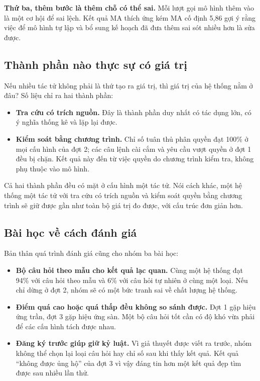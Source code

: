 \textbf{Thứ ba, thêm bước là thêm chỗ có thể sai.} Mỗi lượt gọi mô hình thêm vào là một cơ hội để sai lệch. Kết quả MA thích ứng kém MA cố định 5,86 \pp{} gợi ý rằng việc để mô hình tự lập và bổ sung kế hoạch đã đưa thêm sai sót nhiều hơn là sửa được.

\subsection{Thành phần nào thực sự có giá trị}

Nếu nhiều tác tử không phải là thứ tạo ra giá trị, thì giá trị của hệ thống nằm ở đâu? Số liệu chỉ ra hai thành phần:

\begin{itemize}
    \item \textbf{Tra cứu có trích nguồn.} Đây là thành phần duy nhất có tác dụng lớn, có ý nghĩa thống kê và lặp lại được.
    \item \textbf{Kiểm soát bằng chương trình.} Chỉ số tuân thủ phân quyền đạt 100\% ở mọi cấu hình của đợt 2; các câu lệnh cài cắm và yêu cầu vượt quyền ở đợt 1 đều bị chặn. Kết quả này đến từ việc quyền do chương trình kiểm tra, không phụ thuộc vào mô hình.
\end{itemize}

Cả hai thành phần đều có mặt ở cấu hình một tác tử. Nói cách khác, một hệ thống một tác tử với tra cứu có trích nguồn và kiểm soát quyền bằng chương trình sẽ giữ được gần như toàn bộ giá trị đo được, với cấu trúc đơn giản hơn.

\subsection{Bài học về cách đánh giá}

Bản thân quá trình đánh giá cũng cho nhóm ba bài học:

\begin{itemize}
    \item \textbf{Bộ câu hỏi theo mẫu cho kết quả lạc quan.} Cùng một hệ thống đạt 94\% với câu hỏi theo mẫu và 6\% với câu hỏi tự nhiên ở cùng một loại. Nếu chỉ dừng ở đợt 2, nhóm sẽ có một bức tranh sai về chất lượng hệ thống.
    \item \textbf{Điểm quá cao hoặc quá thấp đều không so sánh được.} Đợt 1 gặp hiệu ứng trần, đợt 3 gặp hiệu ứng sàn. Một bộ câu hỏi tốt cần có độ khó vừa phải để các cấu hình tách được nhau.
    \item \textbf{Đăng ký trước giúp giữ kỷ luật.} Vì giả thuyết được viết ra trước, nhóm không thể chọn lại loại câu hỏi hay chỉ số sau khi thấy kết quả. Kết quả ``không được ủng hộ'' của đợt 3 vì vậy đáng tin hơn một kết quả đẹp tìm được sau nhiều lần thử.
\end{itemize}

